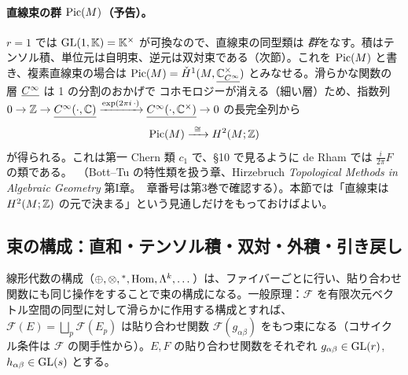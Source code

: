 \paragraph{直線束の群 $\mathrm{Pic}(M)$（予告）。}$r=1$ では $\mathrm{GL}(1,\mathbb K)=\mathbb K^\times$ が可換なので、直線束の同型類は \emph{群}をなす。積はテンソル積、単位元は自明束、逆元は双対束である（次節）。これを $\mathrm{Pic}(M)$ と書き、複素直線束の場合は $\mathrm{Pic}(M)=\check H^1(M,\underline{\mathbb C^\times_{C^\infty}})$ とみなせる。滑らかな関数の層 $\underline{C^\infty}$ は 1 の分割のおかげで \Cech{} コホモロジーが消える（細い層）ため、指数列 $0\to\mathbb Z\to\underline{C^\infty(\cdot,\mathbb C)}\xrightarrow{\exp(2\pi i\,\cdot)}\underline{C^\infty(\cdot,\mathbb C^\times)}\to0$ の長完全列から
\[
\Pic(M)\xrightarrow{\ \cong\ }H^2(M;\Z)
\]
が得られる。これは第一 Chern 類 $c_1$ で、§10 で見るように de Rham では $\frac i{2\pi}F$ の類である。\tC\ （Bott--Tu の特性類を扱う章、Hirzebruch \emph{Topological Methods in Algebraic Geometry} 第I章。\tQ\ 章番号は第3巻で確認する）。本節では「直線束は $H^2(M;\mathbb Z)$ の元で決まる」という見通しだけをもっておけばよい。

\subsection{束の構成：直和・テンソル積・双対・外積・引き戻し}
線形代数の構成（$\oplus,\otimes,{}^*,\mathrm{Hom},\Lambda^k,\dots$）は、ファイバーごとに行い、貼り合わせ関数にも同じ操作をすることで束の構成になる。一般原理：$\mathcal F$ を有限次元ベクトル空間の同型に対して滑らかに作用する構成とすれば、$\mathcal F(E)=\bigsqcup_p\mathcal F(E_p)$ は貼り合わせ関数 $\mathcal F(g_{\alpha\beta})$ をもつ束になる（コサイクル条件は $\mathcal F$ の関手性から）。$E,F$ の貼り合わせ関数をそれぞれ $g_{\alpha\beta}\in\mathrm{GL}(r)$, $h_{\alpha\beta}\in\mathrm{GL}(s)$ とする。

